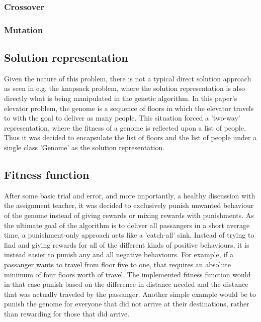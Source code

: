 \subsubsection{Crossover}

\subsubsection{Mutation}


\subsection{Solution representation}

    Given the nature of this problem, there is not a typical direct solution approach as seen in e.g. the knapsack problem, where the solution representation is also directly what is being manipulated in the genetic algorithm. In this paper's elevator problem, the genome is a sequence of floors in which the elevator travels to with the goal to deliver as many people. This situation forced a 'two-way' representation, where the fitness of a genome is reflected upon a list of people. Thus it was decided to encapsulate the list of floors and the list of people under a single class 'Genome' as the solution representation.

\subsection{Fitness function}

    After some basic trial and error, and more importantly, a healthy discussion with the assignment teacher, it was decided to exclusively punish unwanted behaviour of the genome instead of giving rewards or mixing rewards with punishments. As the ultimate goal of the algorithm is to deliver all passangers in a short average time, a punishment-only approach acts like a 'catch-all' sink. Instead of trying to find and giving rewards for all of the different kinds of positive behaviours, it is instead easier to punish any and all negative behaviours. For example, if a passanger wants to travel from floor five to one, that requires an absolute minimum of four floors worth of travel. The implemented fitness function would in that case punish based on the difference in distance needed and the distance that was actually traveled by the passanger. Another simple example would be to punish the genome for everyone that did not arrive at their destinations, rather than rewarding for those that did arrive.



